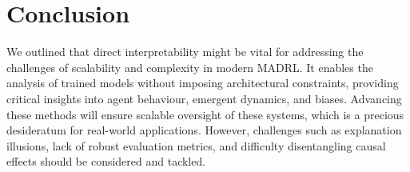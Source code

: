 
\section{Conclusion}

We outlined that direct interpretability might be vital for addressing the challenges of scalability and complexity in modern MADRL. It enables the analysis of trained models without imposing architectural constraints, providing critical insights into agent behaviour, emergent dynamics, and biases. Advancing these methods will ensure scalable oversight of these systems, which is a precious desideratum for real-world applications. However, challenges such as explanation illusions, lack of robust evaluation metrics, and difficulty disentangling causal effects should be considered and tackled.
